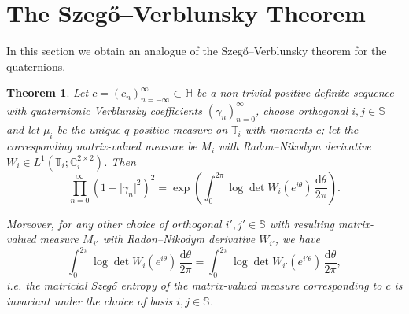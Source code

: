 \documentclass[11pt,reqno]{amsart}
\def\g{\gamma}
\def\th{\theta}
\def\rmd{\mathrm{d}}
\def\CC{\mathbb{C}}
\def\SS{\mathbb{S}}
\def\TT{\mathbb{T}}
\def\HH{\mathbb{H}}
\newtheorem{theorem}{Theorem}[section]
\theoremstyle{definition}
\numberwithin{equation}{section}
\begin{document}
\section{The Szeg\H{o}--Verblunsky Theorem}

In this section we obtain an analogue of the Szeg\H{o}--Verblunsky theorem for the quaternions.

\begin{theorem}
\label{thm:QuaternionicSV}
    Let \(c = (c_n)_{n=-\infty}^{\infty} \subset \HH\) be a non-trivial positive definite sequence with quaternionic Verblunsky coefficients \((\g_n)_{n=0}^{\infty}\), choose orthogonal \(i,j\in\SS\) and let \(\mu_i\) be the unique \(q\)-positive measure on \(\TT_i\) with moments \(c\); let the corresponding matrix-valued measure be \(M_i\) with Radon--Nikodym derivative \(W_i \in L^1(\TT_i; \CC_i^{2\times2})\). Then
    \begin{equation}
    \label{eq:quaternionicSV}
        \prod_{n=0}^{\infty} (1 - \lvert \g_n \rvert^2)^2 = \exp\left(\int_0^{2\pi} \log \det W_i(e^{i\th}) \, \frac{\rmd\th}{2\pi}\right).
    \end{equation}

    Moreover, for any other choice of orthogonal \(i',j' \in \SS\) with resulting matrix-valued measure \(M_{i'}\) with Radon--Nikodym derivative \(W_{i'}\), we have
    \[
        \int_0^{2\pi} \log \det W_i(e^{i\th}) \, \frac{\rmd\th}{2\pi} = \int_0^{2\pi} \log \det W_{i'}(e^{i' \th}) \, \frac{\rmd\th}{2\pi},
    \]
    i.e. the matricial Szeg\H{o} entropy of the matrix-valued measure corresponding to \(c\) is invariant under the choice of basis \(i,j\in\SS\).
\end{theorem}
\end{document}
